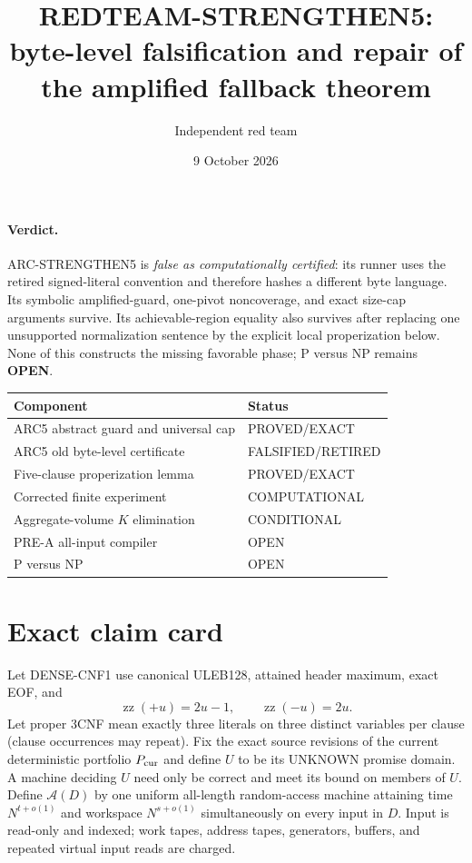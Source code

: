 \documentclass[11pt]{article}
\title{REDTEAM-STRENGTHEN5: byte-level falsification and repair of the amplified fallback theorem}
\author{Independent red team}
\date{9 October 2026}
\begin{document}
\maketitle

\paragraph{Verdict.}
ARC-STRENGTHEN5 is \emph{false as computationally certified}: its runner uses
the retired signed-literal convention and therefore hashes a different byte
language.  Its symbolic amplified-guard, one-pivot noncoverage, and exact
size-cap arguments survive.  Its achievable-region equality also survives
after replacing one unsupported normalization sentence by the explicit local
properization below.  None of this constructs the missing favorable phase;
P versus NP remains \textbf{OPEN}.

\begin{center}
\begin{tabular}{ll}
\toprule
Component & Status\\\midrule
ARC5 abstract guard and universal cap & PROVED/EXACT\\
ARC5 old byte-level certificate & FALSIFIED/RETIRED\\
Five-clause properization lemma & PROVED/EXACT\\
Corrected finite experiment & COMPUTATIONAL\\
Aggregate-volume $K$ elimination & CONDITIONAL\\
PRE-A all-input compiler & OPEN\\
P versus NP & OPEN\\\bottomrule
\end{tabular}
\end{center}

\section{Exact claim card}
Let DENSE-CNF1 use canonical ULEB128, attained header maximum, exact EOF, and
\[
 \operatorname{zz}(+u)=2u-1,\qquad \operatorname{zz}(-u)=2u.
\]
Let proper 3CNF mean exactly three literals on three distinct variables per
clause (clause occurrences may repeat).  Fix the exact source revisions of
the current deterministic portfolio $P_{\rm cur}$ and define $U$ to be its
UNKNOWN promise domain.  A machine deciding $U$ need only be correct and meet
its bound on members of $U$.  Define $\mathcal A(D)$ by one uniform all-length
random-access machine attaining time $N^{t+o(1)}$ and workspace
$N^{s+o(1)}$ simultaneously on every input in $D$.  Input is read-only and
indexed; work tapes, address tapes, generators, buffers, and repeated virtual
input reads are charged.
\end{document}
